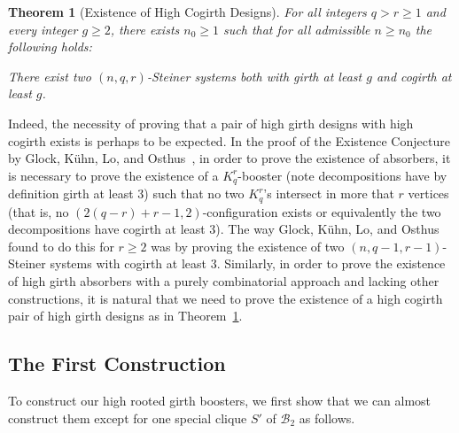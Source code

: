 \documentclass[11pt]{article}
\newcounter{i}
\theoremstyle{plain}
\newtheorem{thm}{Theorem}[section]
\theoremstyle{plain} %
\theoremstyle{definition}
\newcommand{\LP}[1]{\textcolor{Red}{ $\blacktriangleright$\ {\sf LP: #1}\
  $\blacktriangleleft$ }}
\begin{document}
\begin{thm}[Existence of High Cogirth Designs]\label{thm:HighCogirthSteiner}
For all integers $q > r \geq 1$ and every integer $g\ge 2$, there exists $n_0 \ge 1$ such that for all admissible $n\ge n_0$ the following holds: 

There exist two $(n,q,r)$-Steiner systems both with girth at least $g$ and cogirth at least $g$. 
\end{thm}

Indeed, the necessity of proving that a pair of high girth designs with high cogirth exists is perhaps to be expected. In the proof of the Existence Conjecture by Glock, K\"{u}hn, Lo, and Osthus~\cite{GKLO16}, in order to prove the existence of absorbers, it is necessary to prove the existence of a $K_q^r$-booster (note decompositions have by definition girth at least 3) such that no two $K_q^r$'s intersect in more that $r$ vertices (that is, no $(2(q-r)+r-1,2)$-configuration exists or equivalently the two decompositions have cogirth at least $3$). The way Glock, K\"{u}hn, Lo, and Osthus~\cite{GKLO16} found to do this for $r\ge 2$ was by proving the existence of two $(n,q-1,r-1)$-Steiner systems with cogirth at least $3$. Similarly, in order to prove the existence of high girth absorbers with a purely combinatorial approach and lacking other constructions, it is natural that we need to prove the existence of a high cogirth pair of high girth designs as in Theorem~\ref{thm:HighCogirthSteiner}.


\subsection{The First Construction}

To construct our high rooted girth boosters, we first show that we can almost construct them except for one special clique $S'$ of $\mathcal{B}_2$ as follows.
\end{document}
